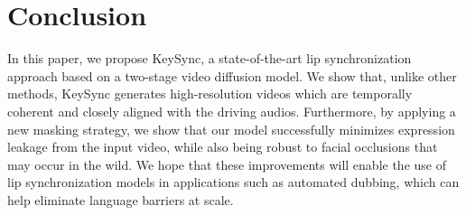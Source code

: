 \section{Conclusion} \label{sec:conclusion}
In this paper, we propose KeySync, a state-of-the-art lip synchronization approach based on a two-stage video diffusion model. We show that, unlike other methods, KeySync generates high-resolution videos which are temporally coherent and closely aligned with the driving audios. Furthermore, by applying a new masking strategy, we show that our model successfully minimizes expression leakage from the input video, while also being robust to facial occlusions that may occur in the wild. We hope that these improvements will enable the use of lip synchronization models in applications such as automated dubbing, which can help eliminate language barriers at scale.